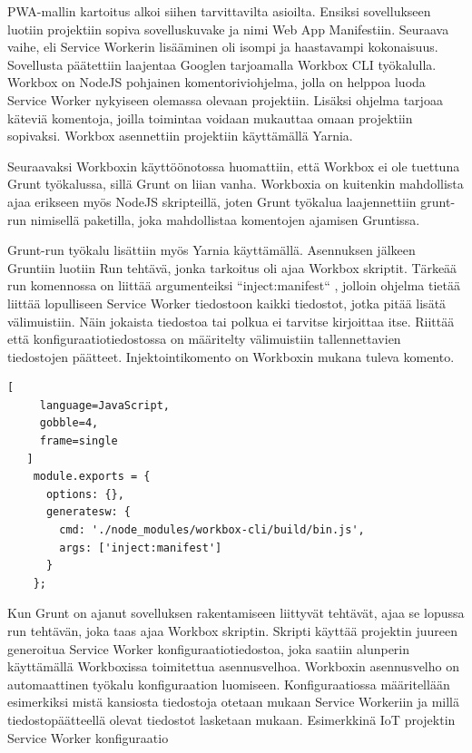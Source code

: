 \documentclass{tktltiki}
\begin{document}
PWA-mallin kartoitus alkoi siihen tarvittavilta asioilta. Ensiksi sovellukseen luotiin projektiin sopiva sovelluskuvake ja nimi Web App Manifestiin. Seuraava vaihe, eli Service Workerin lisääminen oli isompi ja haastavampi kokonaisuus. Sovellusta päätettiin laajentaa Googlen tarjoamalla Workbox CLI työkalulla. Workbox on NodeJS pohjainen komentoriviohjelma, jolla on helppoa luoda Service Worker nykyiseen olemassa olevaan projektiin. Lisäksi ohjelma tarjoaa käteviä komentoja, joilla toimintaa voidaan mukauttaa omaan projektiin sopivaksi. Workbox asennettiin projektiin käyttämällä Yarnia.

Seuraavaksi Workboxin käyttöönotossa huomattiin, että Workbox ei ole tuettuna Grunt työkalussa, sillä Grunt on liian vanha. Workboxia on kuitenkin mahdollista ajaa erikseen myös NodeJS skripteillä, joten Grunt työkalua laajennettiin grunt-run nimisellä paketilla, joka mahdollistaa komentojen ajamisen Gruntissa. 

Grunt-run työkalu lisättiin myös Yarnia käyttämällä. Asennuksen jälkeen Gruntiin luotiin Run tehtävä, jonka tarkoitus oli ajaa Workbox skriptit. Tärkeää run komennossa on liittää argumenteiksi “inject:manifest“ \cite{Googlec}, jolloin ohjelma tietää liittää lopulliseen Service Worker tiedostoon kaikki tiedostot, jotka pitää lisätä välimuistiin. Näin jokaista tiedostoa tai polkua ei tarvitse kirjoittaa itse. Riittää että konfiguraatiotiedostossa on määritelty välimuistiin tallennettavien tiedostojen päätteet. Injektointikomento on Workboxin mukana tuleva komento.

\begin{lstlisting}[
     language=JavaScript,
     gobble=4,
     frame=single
   ]
    module.exports = {
      options: {},
      generatesw: {
        cmd: './node_modules/workbox-cli/build/bin.js',
        args: ['inject:manifest']
      }
    };
\end{lstlisting}

Kun Grunt on ajanut sovelluksen rakentamiseen liittyvät tehtävät, ajaa se lopussa run tehtävän, joka taas ajaa Workbox skriptin. Skripti käyttää projektin juureen generoitua Service Worker konfiguraatiotiedostoa, joka saatiin alunperin käyttämällä Workboxissa toimitettua asennusvelhoa. Workboxin asennusvelho on automaattinen työkalu konfiguraation luomiseen. Konfiguraatiossa määritellään esimerkiksi mistä kansiosta tiedostoja otetaan mukaan Service Workeriin ja millä tiedostopäätteellä olevat tiedostot lasketaan mukaan. Esimerkkinä IoT projektin Service Worker konfiguraatio
\end{document}
